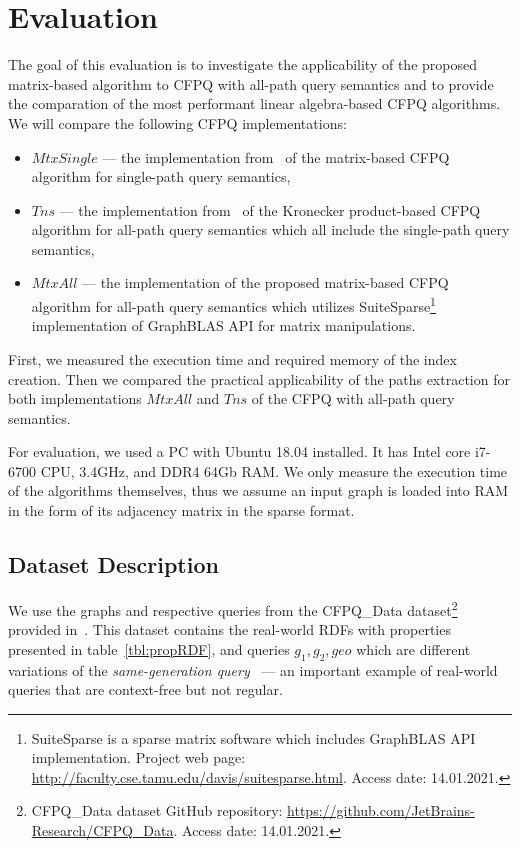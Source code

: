 \section{Evaluation}
The goal of this evaluation is to investigate the applicability of the proposed matrix-based algorithm to CFPQ with all-path query semantics and to provide the comparation of the most performant linear algebra-based CFPQ algorithms. We will compare the following CFPQ implementations:
\begin{itemize}
	\item $MtxSingle$ --- the implementation from~\cite{10.1145/3398682.3399163} of the matrix-based CFPQ algorithm for single-path query semantics,
	\item $Tns$ --- the implementation from~\cite{} of the Kronecker product-based CFPQ algorithm for all-path query semantics which all include the single-path query semantics,
	\item $MtxAll$ --- the implementation of the proposed matrix-based CFPQ algorithm for all-path query semantics which utilizes SuiteSparse\footnote{SuiteSparse is a sparse matrix software which includes GraphBLAS API implementation. Project web page: \url{http://faculty.cse.tamu.edu/davis/suitesparse.html}. Access date: 14.01.2021.}~\cite{Davis2018Algorithm9S} implementation of GraphBLAS API for matrix manipulations.
\end{itemize}

First, we measured the execution time and required memory of the index creation. Then we compared the practical applicability of the paths extraction for both implementations $MtxAll$ and $Tns$ of the CFPQ with all-path query semantics.

For evaluation, we used a PC with Ubuntu 18.04 installed.
It has Intel core i7-6700 CPU, 3.4GHz, and DDR4 64Gb RAM.
We only measure the execution time of the algorithms themselves, thus we assume an input graph is loaded into RAM in the form of its adjacency matrix in the sparse format.

\subsection{Dataset Description}

We use the graphs and respective queries from the CFPQ\_Data dataset\footnote{CFPQ\_Data dataset GitHub repository: \url{https://github.com/JetBrains-Research/CFPQ_Data}. Access date: 14.01.2021.} provided in~\cite{10.1145/3398682.3399163}. This dataset contains the real-world RDFs with properties presented in table~\ref{tbl:propRDF}, and queries $g_1, g_2, geo$ 
which are different variations of the \textit{same-generation query}~\cite{FndDB} --- an important example of real-world queries that are context-free but not regular.




